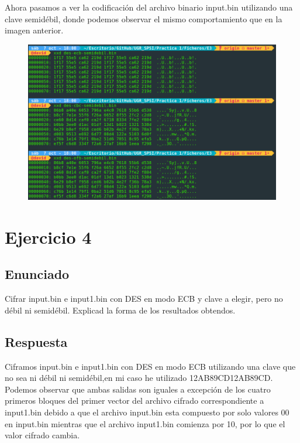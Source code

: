 \documentclass[10pt,a4paper,spanish]{report}
\begin{document}
\noindent
Ahora pasamos a ver la codificación del archivo binario input.bin utilizando una clave semidébil, donde podemos observar el mismo comportamiento que en la imagen anterior.

\begin{figure}[!hbp]
 \centering  \includegraphics[width=1\textwidth]{./Imagenes/7.png}
\end{figure}



\chapter{Ejercicio 4}

\section{Enunciado}
\noindent
Cifrar input.bin e input1.bin con DES en modo ECB y clave a elegir, pero no débil ni semidébil. Explicad la forma de los resultados obtendos.

\section{Respuesta}
\noindent
Ciframos input.bin e input1.bin con DES en modo ECB utilizando una clave que no sea ni débil ni semidébil,en mi caso he utilizado 12AB89CD12AB89CD. \\

\noindent
Podemos observar que ambas salidas son iguales a excepción de los cuatro primeros bloques del primer vector del archivo cifrado correspondiente a input1.bin debido a que el archivo input.bin esta compuesto por solo valores 00 en input.bin mientras que el archivo input1.bin comienza por 10, por lo que el valor cifrado cambia.
\end{document}
